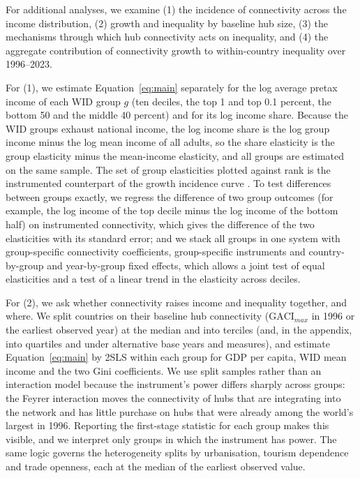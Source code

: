 For additional analyses, we examine (1) the incidence of connectivity across the income distribution, (2) growth and inequality by baseline hub size, (3) the mechanisms through which hub connectivity acts on inequality, and (4) the aggregate contribution of connectivity growth to within-country inequality over 1996--2023.

For (1), we estimate Equation~\eqref{eq:main} separately for the log average pretax income of each WID group $g$ (ten deciles, the top 1 and top 0.1 percent, the bottom 50 and the middle 40 percent) and for its log income share. Because the WID groups exhaust national income, the log income share is the log group income minus the log mean income of all adults, so the share elasticity is the group elasticity minus the mean-income elasticity, and all groups are estimated on the same sample. The set of group elasticities plotted against rank is the instrumented counterpart of the growth incidence curve \citep{Ravallion_2003}. To test differences between groups exactly, we regress the difference of two group outcomes (for example, the log income of the top decile minus the log income of the bottom half) on instrumented connectivity, which gives the difference of the two elasticities with its standard error; and we stack all groups in one system with group-specific connectivity coefficients, group-specific instruments and country-by-group and year-by-group fixed effects, which allows a joint test of equal elasticities and a test of a linear trend in the elasticity across deciles.

For (2), we ask whether connectivity raises income and inequality together, and where. We split countries on their baseline hub connectivity ($\mathrm{GACI}_{max}$ in 1996 or the earliest observed year) at the median and into terciles (and, in the appendix, into quartiles and under alternative base years and measures), and estimate Equation~\eqref{eq:main} by 2SLS within each group for GDP per capita, WID mean income and the two Gini coefficients. We use split samples rather than an interaction model because the instrument's power differs sharply across groups: the Feyrer interaction moves the connectivity of hubs that are integrating into the network and has little purchase on hubs that were already among the world's largest in 1996. Reporting the first-stage statistic for each group makes this visible, and we interpret only groups in which the instrument has power. The same logic governs the heterogeneity splits by urbanisation, tourism dependence and trade openness, each at the median of the earliest observed value.

